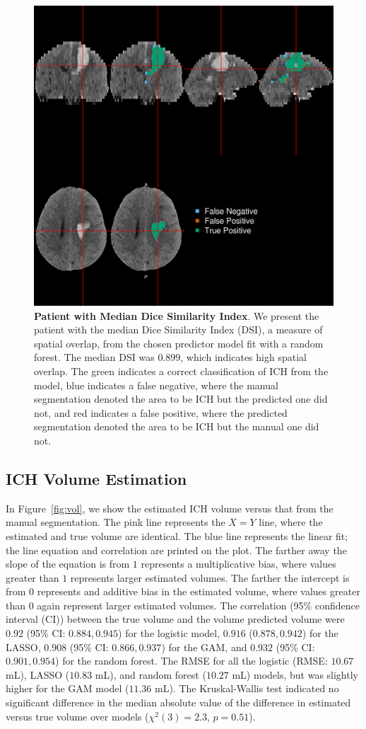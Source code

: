 \documentclass{elsarticle_nonatbib}\usepackage[]{graphicx}\usepackage[]{color}
\begin{document}
\begin{figure}
\centering
\includegraphics[width=0.75\linewidth,keepaspectratio]{Reseg_Figure_DSI_Quantile_050_native.png}
\caption{{\bf Patient with Median Dice Similarity Index}. We present the patient with the median Dice Similarity Index (DSI), a measure of spatial overlap, from the chosen predictor model fit with a random forest.  The median DSI was $0.899$, which indicates high spatial overlap. The green indicates a correct classification of ICH from the model, blue indicates a false negative, where the manual segmentation denoted the area to be ICH but the predicted one did not, and red indicates a false positive, where the predicted segmentation denoted the area to be ICH but the manual one did not. }
\label{fig:dice_img}
\end{figure}

\subsection{ICH Volume Estimation}
In Figure~\ref{fig:vol}, we show the estimated ICH volume versus that from the manual segmentation.  The pink line represents the $X = Y$ line, where the estimated and true volume are identical.  The blue line represents the linear fit; the line equation and correlation are printed on the plot.  The farther away the slope of the equation is from $1$ represents a multiplicative bias, where values greater than $1$ represents larger estimated volumes.  The farther the intercept is from $0$ represents and additive bias in the estimated volume, where values greater than $0$ again represent larger estimated volumes.  The correlation (95\% confidence interval (CI)) between the true volume and the volume predicted volume were $0.92$ (95\% CI: $0.884, 0.945$) for the logistic model, 
$0.916$ ($0.878, 0.942$) for the LASSO, 
$0.908$ (95\% CI: $0.866, 0.937$) for the GAM, and  
$0.932$ (95\% CI: $0.901, 0.954$) for the random forest.  The RMSE for all the logistic (RMSE: $10.67$ mL), LASSO ($10.83$ mL), and random forest ($10.27$ mL) models, but was slightly higher for the GAM model ($11.36$ mL).  The  Kruskal-Wallis test indicated no significant difference in the median absolute value of the difference in estimated versus true volume over models ($\chi^{2}(3)=2.3$, $p = 0.51$).  
\end{document}
